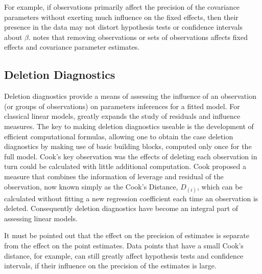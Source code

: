 \documentclass[12pt, a4paper]{report}
\theoremstyle{plain}
\theoremstyle{definition}
\theoremstyle{remark}
\begin{document}
For example, if observations primarily affect the precision of the covariance parameters without exerting much influence on the fixed effects, then their presence in the data may not distort hypothesis
tests or confidence intervals about $\beta$. 
\citet{schabenberger} notes that removing observations or sets of observations affects fixed effects and covariance parameter estimates.





\subsection{Deletion Diagnostics}



Deletion diagnostics provide a means of assessing the influence of an observation (or groups of observations) on parameters inferences for a fitted model. For classical linear models, \citet{cook77} greatly expands the study of residuals and influence measures. The key to making deletion diagnostics useable is the development of efficient computational formulas, allowing one to obtain the  case deletion diagnostics by making use of basic building blocks, computed only once for the full model.
Cook's key observation was the effects of deleting each observation in turn could be calculated with little additional computation. Cook proposed a measure that combines the information of leverage and residual of the observation, now known simply as the Cook's Distance, $D_{(i)}$, which can be calculated without fitting a new regression coefficient each time an observation is deleted. Consequently deletion diagnostics have become an integral part of assessing linear models.



It must be pointed out that the effect on the precision of estimates is separate from the effect on the point estimates. Data points that have a small Cook's distance, for example, can still greatly affect hypothesis tests and confidence intervals, if their 
influence on the precision of the estimates is large.	
\end{document}
